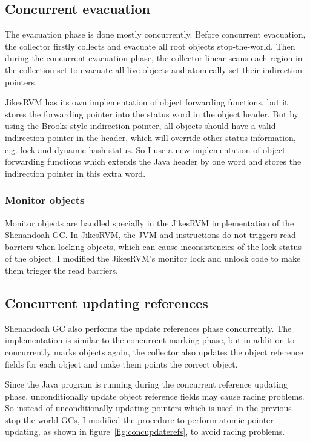 \subsection{Concurrent evacuation}

The evacuation phase is done mostly concurrently. Before concurrent evacuation,
the collector firstly collects and evacuate all root objects stop-the-world.
Then during the concurrent evacuation phase, the collector linear scans each region in the
collection set to evacuate all live objects and atomically set their indirection
pointers.

JikesRVM has its own implementation of object forwarding functions, but it stores the forwarding
pointer into the status word in the object header. But by using the Brooks-style indirection
pointer, all objects should have a valid indirection pointer in the header, which will override other status
information, e.g. lock and dynamic hash status. So I use a new implementation of
object forwarding functions which extends the Java header by one word and stores the indirection
pointer in this extra word.

\subsubsection{Monitor objects}

Monitor objects are handled specially in the JikesRVM implementation of the Shenandoah GC.
In JikesRVM, the JVM  and  instructions
do not triggers read barriers when locking objects, which can cause inconsistencies 
of the lock status of the object. I modified the JikesRVM's monitor lock and unlock
code to make them trigger the read barriers.

\subsection{Concurrent updating references}

Shenandoah GC also performs the update references phase concurrently.
The implementation is similar to the concurrent marking phase, but in addition to
concurrently marks objects again, the collector also updates the object reference fields
for each object and make them points the correct object.

Since the Java program is running during the concurrent reference updating phase,
unconditionally update object reference fields may cause racing problems. So instead of
unconditionally updating pointers which is used in the previous stop-the-world GCs,
I modified the procedure to perform
atomic pointer updating, as shown in figure~\ref{fig:concupdaterefs},
to avoid racing problems.

